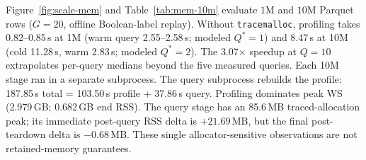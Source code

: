 Figure~\ref{fig:scale-mem} and Table~\ref{tab:mem-10m} evaluate $1\text{M}$ and $10\text{M}$ Parquet rows ($G=20$, offline Boolean-label replay). Without \texttt{tracemalloc}, profiling takes 0.82--0.85\,s at 1M (warm query 2.55--2.58\,s; modeled $Q^*=1$) and 8.47\,s at 10M (cold 11.28\,s, warm 2.83\,s; modeled $Q^*=2$). The 3.07$\times$ speedup at $Q=10$ extrapolates per-query medians beyond the five measured queries.
Each 10M stage ran in a separate subprocess. The query subprocess rebuilds the profile: 187.85\,s total = 103.50\,s profile + 37.86\,s query. Profiling dominates peak WS (2.979\,GB; 0.682\,GB end RSS). The query stage has an 85.6\,MB traced-allocation peak; its immediate post-query RSS delta is $+21.69$\,MB, but the final post-teardown delta is $-0.68$\,MB. These single allocator-sensitive observations are not retained-memory guarantees.
